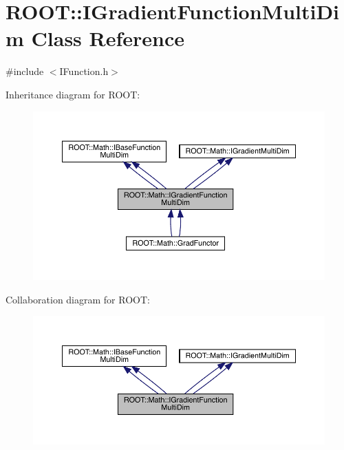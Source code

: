 \hypertarget{classROOT_1_1Math_1_1IGradientFunctionMultiDim}{}\section{R\+O\+OT\+:\+:I\+Gradient\+Function\+Multi\+Dim Class Reference}
\label{classROOT_1_1Math_1_1IGradientFunctionMultiDim}


{\ttfamily \#include $<$I\+Function.\+h$>$}



Inheritance diagram for R\+O\+OT\+:\nopagebreak
\begin{figure}[H]
\begin{center}
\leavevmode
\includegraphics[width=350pt]{d9/dbf/classROOT_1_1Math_1_1IGradientFunctionMultiDim__inherit__graph}
\end{center}
\end{figure}


Collaboration diagram for R\+O\+OT\+:\nopagebreak
\begin{figure}[H]
\begin{center}
\leavevmode
\includegraphics[width=350pt]{d1/dda/classROOT_1_1Math_1_1IGradientFunctionMultiDim__coll__graph}
\end{center}
\end{figure}
